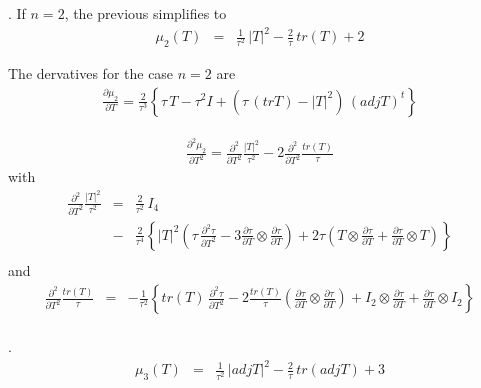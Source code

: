 \documentclass{report}
\begin{document}
. \newline
If $n=2$, the previous simplifies to
\begin{eqnarray}
\mu_2 (T) & = &  \frac{1}{\tau^2} \, |T|^2 - \frac{2}{\tau} \, tr(T) + 2
\end{eqnarray}

\noindent The dervatives for the case $n=2$ are
\begin{eqnarray}
\frac{\partial \mu_2}{\partial T} = \frac{2}{\tau^3} \left\{ \tau \, T - \tau^2 I + \left( \tau \, (tr T) - |T|^2 \right) \, (adj T)^t \right\}
\end{eqnarray}


\begin{eqnarray}
\frac{\partial^2 \mu_2}{\partial T^2} = \frac{\partial^2}{\partial T^2} \frac{|T|^2}{\tau^2} - 2 \frac{\partial^2}{\partial T^2} \frac{tr(T)}{\tau}
\end{eqnarray}
with
\begin{eqnarray}
 \frac{\partial^2}{\partial T^2} \frac{|T|^2}{\tau^2} & = & \frac{2}{\tau^2} \, I_{4} \nonumber \\
 & - & \frac{2}{\tau^4} \left\{ |T|^2 \left( \tau \, \frac{\partial^2 \tau}{\partial T^2} - 3 \frac{\partial \tau}{\partial T} \otimes \frac{\partial \tau}{\partial T}  \right) + 2 \tau \left( T \otimes \frac{\partial \tau}{\partial T} + \frac{\partial \tau}{\partial T} \otimes T \right) \right\} \nonumber \\
\end{eqnarray}
and 
\begin{eqnarray}
 \frac{\partial^2}{\partial T^2} \frac{tr(T)}{\tau} & = & -\frac{1}{\tau^2} \left\{ tr(T) \, \frac{\partial^2 \tau}{\partial T^2} -2 \frac{tr(T)}{\tau} \left( \frac{\partial \tau}{\partial T} \otimes \frac{\partial \tau}{\partial T} \right) + I_2 \otimes \frac{\partial \tau}{\partial T} + \frac{\partial \tau}{\partial T} \otimes I_2 \right\} \nonumber \\
\end{eqnarray}

. \newline
\begin{eqnarray}
\mu_3 (T) & = & \frac{1}{\tau^2} \, |adj T|^2 - \frac{2}{\tau} \, tr(adj T) + 3
\end{eqnarray}
\end{document}
